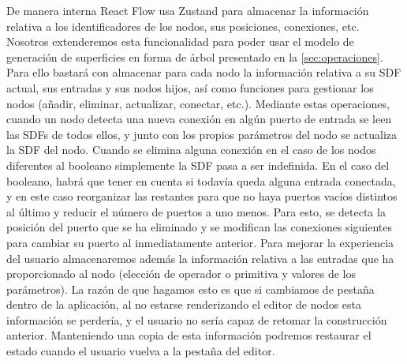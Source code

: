 De manera interna React Flow usa Zustand para almacenar la información relativa a los identificadores de los nodos, sus posiciones, conexiones, etc. Nosotros extenderemos esta funcionalidad para poder usar el modelo de generación de superficies en forma de árbol presentado en la \autoref{sec:operaciones}. Para ello bastará con almacenar para cada nodo la información relativa a su SDF actual, sus entradas y sus nodos hijos, así como funciones para gestionar los nodos (añadir, eliminar, actualizar, conectar, etc.). Mediante estas operaciones, cuando un nodo detecta una nueva conexión en algún puerto de entrada se leen las SDFs de todos ellos, y junto con los propios parámetros del nodo se actualiza la SDF del nodo. Cuando se elimina alguna conexión en el caso de los nodos diferentes al booleano simplemente la SDF pasa a ser indefinida. En el caso del booleano, habrá que tener en cuenta si todavía queda alguna entrada conectada, y en este caso reorganizar las restantes para que no haya puertos vacíos distintos al último y reducir el número de puertos a uno menos. Para esto, se detecta la posición del puerto que se ha eliminado y se modifican las conexiones siguientes para cambiar su puerto al inmediatamente anterior. Para mejorar la experiencia del usuario almacenaremos además la información relativa a las entradas que ha proporcionado al nodo (elección de operador o primitiva y valores de los parámetros). La razón de que hagamos esto es que si cambiamos de pestaña dentro de la aplicación, al no estarse renderizando el editor de nodos esta información se perdería, y el usuario no sería capaz de retomar la construcción anterior. Manteniendo una copia de esta información podremos restaurar el estado cuando el usuario vuelva a la pestaña del editor. \newline
